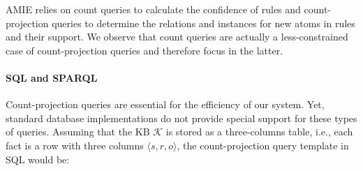 AMIE relies on count queries to calculate the confidence of rules and count-projection queries to determine
the relations and instances for new atoms in rules and their support. We observe that count queries
are actually a less-constrained case of count-projection queries and therefore focus in the latter.

\paragraph{SQL and SPARQL} Count-projection queries are essential for the efficiency of our system. 
Yet, standard database implementations do not provide special support for these types of queries. 
Assuming that the KB $\mathcal{K}$ is stored as a three-columns table, i.e., each fact is a row with three columns 
$\langle s, r, o \rangle$, the count-projection query template in SQL would be: \\ \\

